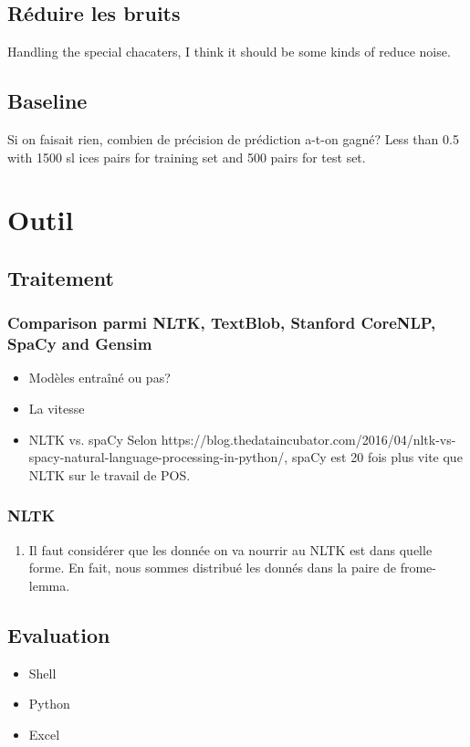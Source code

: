 \documentclass[a4paper]{article}
\begin{document}
\subsection{Réduire les bruits}
Handling the special chacaters, I think it should be some kinds of reduce noise.
\subsection{Baseline}
Si on faisait rien, combien de précision de prédiction a-t-on gagné? 
Less than 0.5 with 1500 sl	ices pairs for training set and 500 pairs for test set.

\section{Outil}
\subsection{Traitement}
\subsubsection{Comparison parmi NLTK, TextBlob, Stanford CoreNLP, SpaCy and Gensim}
\begin{itemize}
\item Modèles entraîné ou pas?
\item La vitesse
\item NLTK vs. spaCy  Selon https://blog.thedataincubator.com/2016/04/nltk-vs-spacy-natural-language-processing-in-python/, spaCy est 20 fois plus vite que NLTK sur le travail de POS.
\end{itemize}
\subsubsection{NLTK}
\begin{enumerate}
\item Il faut considérer que les donnée on va nourrir au NLTK est dans quelle forme. En fait, nous sommes distribué les donnés dans la paire de frome-lemma.
\end{enumerate}

\subsection{Evaluation}
\begin{itemize}
\item Shell
\item Python
\item Excel
\end{itemize}
\end{document}
